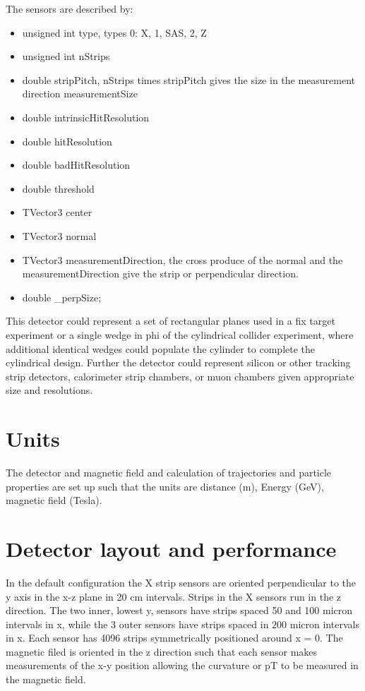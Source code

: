 \documentclass[aps,prd,superscriptaddress,floatfix]{revtex4}
\begin{document}
The sensors are described by:
\begin{itemize}
\item   unsigned int type, types 0: X, 1, SAS, 2, Z
\item  unsigned int nStrips
\item   double stripPitch, nStrips times stripPitch gives the size in the measurement direction measurementSize
\item   double intrinsicHitResolution
\item   double hitResolution
\item   double badHitResolution
\item  double threshold
\item  TVector3 center
\item  TVector3 normal
\item  TVector3 measurementDirection, the cross produce of the normal and the measurementDirection give the strip or perpendicular direction.
\item  double \_perpSize;
\end{itemize}

This detector could represent a set of rectangular planes used in a fix target experiment
or a single wedge in phi of the cylindrical collider experiment, where additional identical
wedges could populate the cylinder to complete the cylindrical
design.  Further the detector could represent silicon or other
tracking strip detectors, calorimeter strip chambers, or muon
chambers given appropriate size and resolutions.

\section{Units}
 The detector and magnetic field and calculation of trajectories and particle properties are set up such that the units are distance (m), Energy (GeV), magnetic field (Tesla).


\section{Detector layout and performance}
In the default configuration the X strip sensors are oriented perpendicular to the y axis in
the x-z plane in 20 cm intervals.  Strips in the X sensors run in the z
direction.  The two inner, lowest y,  sensors have strips spaced 50
and 100 micron intervals in x, while the 3 outer sensors have strips spaced in 200 micron
intervals in x.  Each sensor has 4096 strips symmetrically positioned
around x = 0.  The magnetic filed is oriented in the z direction such
that each sensor makes measurements of the x-y position allowing
the curvature or pT to be measured in the magnetic field.
\end{document}
